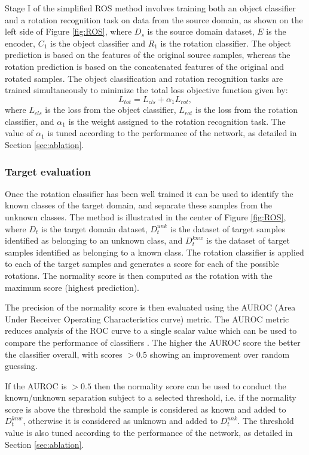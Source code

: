 \documentclass[10pt,twocolumn,letterpaper]{article}
\begin{document}
Stage I of the simplified ROS method involves training both an object classifier and a rotation recognition task on data from the source domain, as shown on the left side of Figure \ref{fig:ROS}, where $D_s$ is the source domain dataset, $E$ is the encoder, $C_1$ is the object classifier and $R_1$ is the rotation classifier. The object prediction is based on the features of the original source samples, whereas the rotation prediction is based on the concatenated features of the original and rotated samples. The object classification and rotation recognition tasks are trained simultaneously to minimize the total loss objective function given by:
\begin{equation}
  L_{tot} = L_{cls} + \alpha_1 L_{rot} ,
  \label{eq:totalloss}
\end{equation}
where $L_{cls}$ is the loss from the object classifier, $L_{rot}$ is the loss from the rotation classifier, and $\alpha_1$ is the weight assigned to the rotation recognition task. The value of $\alpha_1$ is tuned according to the performance of the network, as detailed in Section \ref{sec:ablation}.


\subsubsection*{Target evaluation}

Once the rotation classifier has been well trained it can be used to identify the known classes of the target domain, and separate these samples from the unknown classes. The method is illustrated in the center of Figure \ref{fig:ROS}, where $D_t$ is the target domain dataset, $D_t^{unk}$ is the dataset of target samples identified as belonging to an unknown class, and $D^{knw}_t$ is the dataset of target samples identified as belonging to a known class. The rotation classifier is applied to each of the target samples and generates a score for each of the possible rotations. The normality score is then computed as the rotation with the maximum score (highest prediction).

The precision of the normality score is then evaluated using the AUROC (Area Under Receiver Operating Characteristics curve) metric. The AUROC metric reduces analysis of the ROC curve to a single scalar value which can be used to compare the performance of classifiers \cite{Fawcett2006}. The higher the AUROC score the better the classifier overall, with scores $> 0.5$ showing an improvement over random guessing.

If the AUROC is $> 0.5$ then the normality score can be used to conduct the known/unknown separation subject to a selected threshold, i.e. if the normality score is above the threshold the sample is considered as known and added to $D^{knw}_t$, otherwise it is considered as unknown and added to $D_t^{unk}$. The threshold value is also tuned according to the performance of the network, as detailed in Section \ref{sec:ablation}.
\end{document}
